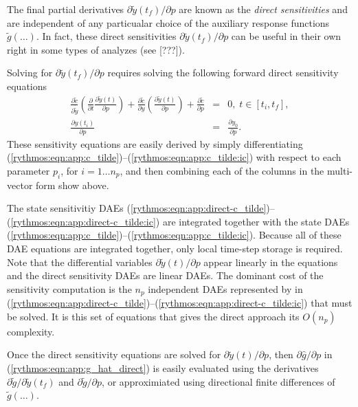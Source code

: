 \documentclass[pdf,ps2pdf,11pt]{SANDreport}
\begin{document}
The final partial derivatives $\partial \tilde{y}(t_f) / {}\partial p$ are
known as the {}\textit{direct sensitivities} and are independent of any
particualar choice of the auxiliary response functions $\tilde{g}(\ldots)$.
In fact, these direct sensitivities $\partial \tilde{y}(t_f) / {}\partial p$
can be useful in their own right in some types of analyzes (see [???]).

Solving for $\partial \tilde{y}(t_f) / {}\partial p$ requires solving the
following forward direct sensitivity equations
%
\begin{eqnarray}
%
\frac{\partial \tilde{c}}{\partial \dot{\tilde{y}}} \left(\frac{\partial}{\partial t} \frac{\partial \tilde{y}(t)}{\partial p} \right)
+ \frac{\partial \tilde{c}}{\partial y} \left(\frac{\partial \tilde{y}(t)}{\partial p}\right)
+ \frac{\partial \tilde{c}}{\partial p} & = & 0, \; t \in \left[ t_i, t_f \right], \label{rythmos:eqn:app:direct-c_tilde} \\
\frac{\partial y(t_i)}{\partial p} & = & \frac{\partial y_0}{\partial p}. \label{rythmos:eqn:app:direct-c_tilde:ic}
\end{eqnarray}
%
These sensitivity equations are easily derived by simply differentiating
(\ref{rythmos:eqn:app:c_tilde})--(\ref{rythmos:eqn:app:c_tilde:ic}) with
respect to each parameter $p_i$, for $i = 1 {}\ldots n_p$, and then combining
each of the columns in the multi-vector form show above.

The state sensitivitiy DAEs
(\ref{rythmos:eqn:app:direct-c_tilde})--(\ref{rythmos:eqn:app:direct-c_tilde:ic})
are integrated together with the state DAEs
(\ref{rythmos:eqn:app:c_tilde})--(\ref{rythmos:eqn:app:c_tilde:ic}).  Because
all of these DAE equations are integrated together, only local time-step
storage is required.  Note that the differential variables ${}\partial
\tilde{y}(t) / {}\partial p$ appear linearly in the equations and the
direct sensitivity DAEs are linear DAEs.  The dominant cost of the sensitivity
computation is the $n_p$ independent DAEs represented by in
(\ref{rythmos:eqn:app:direct-c_tilde})--(\ref{rythmos:eqn:app:direct-c_tilde:ic})
that must be solved.  It is this set of equations that gives the direct
approach its $O(n_p)$ complexity.

Once the direct sensitivity equations are solved for ${}\partial \tilde{y}(t)
/ {}\partial p$, then $\partial {}\hat{g} / {}\partial p$ in
(\ref{rythmos:eqn:app:g_hat_direct}) is easily evaluated using the derivatives
$\partial \tilde{g} / {}\partial \tilde{y}(t_f)$ and $\partial \tilde{g} /
{}\partial p$, or approximiated using directional finite differences of
$\tilde{g}(\ldots)$.
\end{document}
